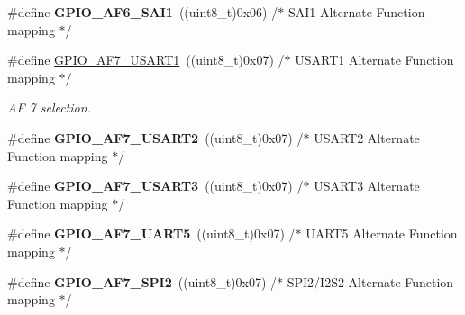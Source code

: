 \begin{DoxyCompactItemize}
\item 
\#define {\bfseries G\+P\+I\+O\+\_\+\+A\+F6\+\_\+\+S\+A\+I1}~((uint8\+\_\+t)0x06)  /$\ast$ S\+A\+I1 Alternate Function mapping       $\ast$/\hypertarget{group___g_p_i_o___alternate__function__selection_ga8ffda74e53816c1e424a292c08e4f8c1}{}\label{group___g_p_i_o___alternate__function__selection_ga8ffda74e53816c1e424a292c08e4f8c1}

\item 
\#define \hyperlink{group___g_p_i_o___alternate__function__selection_gaac2ed5738651fabba7e3163c4c06c410}{G\+P\+I\+O\+\_\+\+A\+F7\+\_\+\+U\+S\+A\+R\+T1}~((uint8\+\_\+t)0x07)  /$\ast$ U\+S\+A\+R\+T1 Alternate Function mapping     $\ast$/\hypertarget{group___g_p_i_o___alternate__function__selection_gaac2ed5738651fabba7e3163c4c06c410}{}\label{group___g_p_i_o___alternate__function__selection_gaac2ed5738651fabba7e3163c4c06c410}

\begin{DoxyCompactList}\small\item\em AF 7 selection. \end{DoxyCompactList}\item 
\#define {\bfseries G\+P\+I\+O\+\_\+\+A\+F7\+\_\+\+U\+S\+A\+R\+T2}~((uint8\+\_\+t)0x07)  /$\ast$ U\+S\+A\+R\+T2 Alternate Function mapping     $\ast$/\hypertarget{group___g_p_i_o___alternate__function__selection_gad7f3d45700eb37dba0a5be513865fd35}{}\label{group___g_p_i_o___alternate__function__selection_gad7f3d45700eb37dba0a5be513865fd35}

\item 
\#define {\bfseries G\+P\+I\+O\+\_\+\+A\+F7\+\_\+\+U\+S\+A\+R\+T3}~((uint8\+\_\+t)0x07)  /$\ast$ U\+S\+A\+R\+T3 Alternate Function mapping     $\ast$/\hypertarget{group___g_p_i_o___alternate__function__selection_ga738f78fdc33cf2bdc3144dd1397c7237}{}\label{group___g_p_i_o___alternate__function__selection_ga738f78fdc33cf2bdc3144dd1397c7237}

\item 
\#define {\bfseries G\+P\+I\+O\+\_\+\+A\+F7\+\_\+\+U\+A\+R\+T5}~((uint8\+\_\+t)0x07)  /$\ast$ U\+A\+R\+T5 Alternate Function mapping      $\ast$/\hypertarget{group___g_p_i_o___alternate__function__selection_ga40fc0774666858f8986fc0586493fbfb}{}\label{group___g_p_i_o___alternate__function__selection_ga40fc0774666858f8986fc0586493fbfb}

\item 
\#define {\bfseries G\+P\+I\+O\+\_\+\+A\+F7\+\_\+\+S\+P\+I2}~((uint8\+\_\+t)0x07)  /$\ast$ S\+P\+I2/\+I2\+S2 Alternate Function mapping  $\ast$/\hypertarget{group___g_p_i_o___alternate__function__selection_ga8ac6139fdac7acc7ff49575424b1e145}{}\label{group___g_p_i_o___alternate__function__selection_ga8ac6139fdac7acc7ff49575424b1e145}


\end{DoxyCompactItemize}

